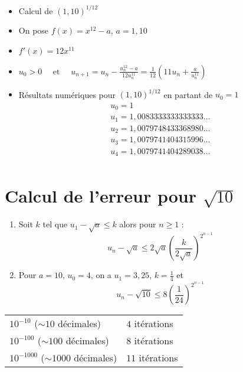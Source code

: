 \begin{frame}

\begin{itemize}[<+->]\setlength{\itemsep}{6pt}
  \item Calcul de $(1,10)^{1/12}$
  \item On pose $f(x)=x^{12}-a$, $a=1,10$
  \item $f'(x)=12x^{11}$
  \item $u_0>0 \quad \text{ et } \quad u_{n+1}= u_n - \frac{u_n^{12}-a}{12u_n^{11}} = \frac1{12} \left(11u_n+\frac{a}{u_n^{11}}\right)$
  \item Résultats numériques pour $(1,10)^{1/12}$ en partant de $u_0=1$
  $$
\begin{array}{l}
  u_0 = 1     \\
  u_1 = 1,0083333333333333 \ldots \\
  u_2 = 1,0079748433368980\ldots \\
  u_3 = 1,0079741404315996 \ldots \\
  u_4 = 1,0079741404289038 \ldots \\
\end{array}
$$  
\end{itemize}


\end{frame}


\section{Calcul de l'erreur pour $\sqrt{10}$}

\begin{frame}
\begin{proposition}
\begin{enumerate}
  \item Soit $k$ tel que $u_1-\sqrt a\le k$ alors pour $n\ge 1$ :
  $$u_n - \sqrt{a} \le 2\sqrt{a} \left( \frac{k}{2\sqrt{a}} \right)^{2^{n-1}}$$

  \pause
  
  \item Pour $a=10$, $u_0=4$, on a $u_1=3,25$, $k = \frac14$ et 
  $$u_n - \sqrt{10} \le 8 \left(\frac{1}{24} \right)^{2^{n-1}}$$
\end{enumerate}
\end{proposition}

  \pause

  \medskip
  
\begin{center}
\begin{tabular}{ll}
  $10^{-10}$ ($\sim 10$ décimales) &  $4$ itérations \\
  $10^{-100}$ ($\sim 100$ décimales) &  $8$ itérations \\ 
  $10^{-1000}$ ($\sim 1000$ décimales) &  $11$ itérations \\ 
\end{tabular}  
\end{center}


\end{frame}



